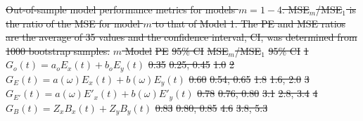 \documentclass[draft,linenumbers]{agujournal2018}
\providecommand{\DIFaddtex}[1]{{\protect\color{blue}\uwave{#1}}} %
\providecommand{\DIFdeltex}[1]{{\protect\color{red}\sout{#1}}}                      %
\providecommand{\DIFdelbegin}{} %
\providecommand{\DIFdelend}{} %
\providecommand{\DIFaddFL}[1]{\DIFadd{#1}} %
\providecommand{\DIFdelFL}[1]{\DIFdel{#1}} %
\providecommand{\DIFaddbeginFL}{} %
\providecommand{\DIFaddendFL}{} %
\providecommand{\DIFdelbeginFL}{} %
\providecommand{\DIFdelendFL}{} %
\providecommand{\DIFadd}[1]{\texorpdfstring{\DIFaddtex{#1}}{#1}} %
\providecommand{\DIFdel}[1]{\texorpdfstring{\DIFdeltex{#1}}{}} %
\begin{document}
\DIFdelbegin %
{%
\DIFdelFL{Out-of-sample model performance metrics for models $m=1-4$. MSE$_m$/MSE$_1$ is the ratio of the MSE for model $m$ to that of Model 1. The PE and MSE ratios are the average of 35 values and the confidence interval, CI, was determined from 1000 bootstrap samples.}}
\DIFdelFL{$m$\hspace{1em} Model }%
\DIFdelFL{PE }%
\DIFdelFL{95\% CI }%
\DIFdelFL{MSE$_m$/MSE$_1$ }%
\DIFdelFL{95\% CI}%
\DIFdelFL{1\hspace{1em} $G_o(t) = a_oE_x(t) + b_oE_y(t)$ }%
\DIFdelFL{0.35 }%
\DIFdelFL{0.25, 0.45}%
\DIFdelFL{1.0 }%
\DIFdelFL{2\hspace{1em} $G_E(t) = a(\omega)E_x(t) + b(\omega)E_y(t)$ }%
\DIFdelFL{0.60 }%
\DIFdelFL{0.54, 0.65}%
\DIFdelFL{1.8 }%
\DIFdelFL{1.6, 2.0}%
\DIFdelFL{3\hspace{1em} $G_{E'}(t) = a(\omega)E'_x(t) + b(\omega)E'_y(t)$ }%
\DIFdelFL{0.78 }%
\DIFdelFL{0.76, 0.80}%
\DIFdelFL{3.1 }%
\DIFdelFL{2.8, 3.4}%
\DIFdelFL{4\hspace{1em} $G_{B}(t) = Z_xB_x(t) + Z_yB_y(t)$ }%
\DIFdelFL{0.83 }%
\DIFdelFL{0.80, 0.85}%
\DIFdelFL{4.6 }%
\DIFdelFL{3.8, 5.3}%
\DIFdelendFL \DIFaddbeginFL \section{\DIFaddFL{Results}}
\DIFaddendFL \label{results}
\DIFdelbeginFL %
\DIFdelend 
\end{document}
